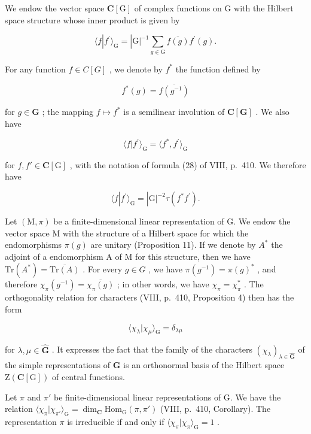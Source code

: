 We endow the vector space \(\mathbf{C}[\mathrm{G}]\) of complex functions on \(\mathrm{G}\) with the Hilbert space structure whose inner product is given by

\[
\langle f | f ^ {\prime} \rangle_ {\mathrm{G}} = | \mathrm{G} | ^ {- 1} \sum_ {g \in \mathrm{G}} \overline {{f (g)}} f ^ {\prime} (g).\tag{50}
\]

For any function \(f \in C[G]\) , we denote by \(f^{*}\) the function defined by

\[
f ^ {*} (g) = \overline {{f (g ^ {- 1})}}\tag{51}
\]

for \(g \in \mathbf{G}\) ; the mapping \(f \mapsto f^*\) is a semilinear involution of \(\mathbf{C}[\mathbf{G}]\) . We also have

\[
\langle f | f ^ {\prime} \rangle_ {\mathrm{G}} = \langle f ^ {*}, f ^ {\prime} \rangle_ {\mathrm{G}}\tag{52}
\]

for \(f, f' \in \mathbf{C}[\mathrm{G}]\) , with the notation of formula (28) of VIII, p.~410. We therefore have

\[
\langle f | f ^ {\prime} \rangle_ {\mathrm{G}} = | \mathrm{G} | ^ {- 2} \tau (f ^ {*} f ^ {\prime}).\tag{53}
\]

Let \((\mathrm{M},\pi)\) be a finite-dimensional linear representation of G. We endow the vector space M with the structure of a Hilbert space for which the endomorphisms \(\pi(g)\) are unitary (Proposition 11). If we denote by \(A^{*}\) the adjoint of a endomorphism A of M for this structure, then we have \(\mathrm{Tr}(A^{*})=\overline{\mathrm{Tr}(A)}\) . For every \(g\in G\) , we have \(\pi(g^{-1})=\pi(g)^{*}\) , and therefore \(\chi_{\pi}(g^{-1})=\overline{\chi_{\pi}(g)}\) ; in other words, we have \(\chi_{\pi}=\chi_{\pi}^{*}\) . The orthogonality relation for characters (VIII, p.~410, Proposition 4) then has the form

\[
\langle \chi_ {\lambda} | \chi_ {\mu} \rangle_ {\mathrm{G}} = \delta_ {\lambda \mu}\tag{54}
\]

for \(\lambda, \mu \in \widehat{\mathbf{G}}\) . It expresses the fact that the family of the characters \((\chi_{\lambda})_{\lambda \in \widehat{\mathbf{G}}}\) of the simple representations of \(\mathbf{G}\) is an orthonormal basis of the Hilbert space \(\mathrm{Z}(\mathbf{C}[\mathrm{G}])\) of central functions.

Let \(\pi\) and \(\pi'\) be finite-dimensional linear representations of G. We have the relation \(\langle \chi_{\pi}|\chi_{\pi'}\rangle_{\mathrm{G}} = \dim_{\mathbf{C}}\mathrm{Hom}_{\mathrm{G}}(\pi, \pi')\) (VIII, p.~410, Corollary). The representation \(\pi\) is irreducible if and only if \(\langle \chi_{\pi}|\chi_{\pi}\rangle_{\mathrm{G}} = 1\) .

